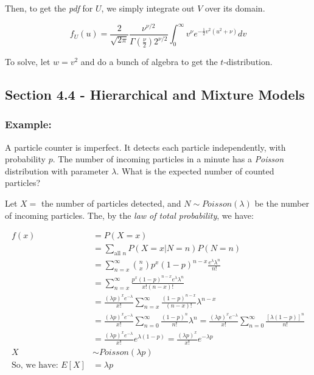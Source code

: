 \documentclass{article}
\begin{document}
\begin{enumerate}
    Then, to get the \textit{pdf} for $U$, we simply integrate out $V$ over its domain.
    
    \begin{equation*}
        f_U(u) = \frac{2}{\sqrt{2\pi}} \frac{\nu^{\nu/2}}{\Gamma\left(\frac{\nu}{2}\right) 2^{\nu/2}} \int_0^\infty v^\nu e^{-\frac{1}{2}v^2(u^2+\nu)}dv
    \end{equation*}
    
    To solve, let $w = v^2$ and do a bunch of algebra to get the $t$-distribution.
\end{enumerate}

\subsection{Section 4.4 - Hierarchical and Mixture Models}

\subsubsection*{Example:}

A particle counter is imperfect. It detects each particle independently, with probability $p$. The number of incoming particles in a minute has a \textit{Poisson} distribution with parameter $\lambda$. What is the expected number of counted particles?

Let $X = $ the number of particles detected, and $N\sim Poisson(\lambda)$ be the number of incoming particles. The, by the \textit{law of total probability}, we have:

\begin{equation*}
    \begin{split}
        f(x) &= P(X=x)\\
            &= \sum_{\text{all } n} P(X=x|N=n)P(N=n)\\
            &= \sum_{n=x}^\infty \binom{n}{x} p^x(1-p)^{n-x}\frac{e^{\lambda}\lambda^n}{n!}\\
            &= \sum_{n=x}^\infty \frac{p^x(1-p)^{n-x}e^{\lambda}\lambda^n}{x!(n-x)!}\\
            &= \frac{(\lambda p)^x e^{-\lambda}}{x!} \sum_{n=x}^\infty \frac{(1-p)^{n-x}}{(n-x)!}\lambda^{n-x}\\
            &= \frac{(\lambda p)^x e^{-\lambda}}{x!} \sum_{n=0}^\infty \frac{(1-p)^{n}}{n!}\lambda^{n} = \frac{(\lambda p)^x e^{-\lambda}}{x!} \sum_{n=0}^\infty \frac{[\lambda(1-p)]^{n}}{n!}\\
            &= \frac{(\lambda p)^x e^{-\lambda}}{x!} e^{\lambda(1-p)} = \frac{(\lambda p)^x}{x!}e^{-\lambda p}\\
            X &\sim Poisson (\lambda p)\\
            \text{So, we have: } E[X] &= \lambda p
    \end{split}
\end{equation*}
\end{document}
